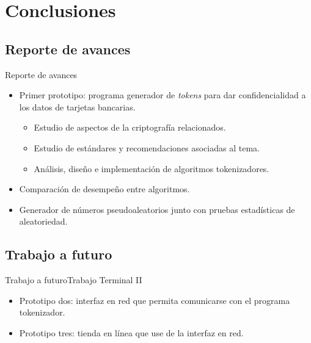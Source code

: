 %
%

\section{Conclusiones}

\subsection{Reporte de avances} %
\begin{frame}{Reporte de avances}

  \begin{itemize}
    \item<2-> Primer prototipo: programa generador de \textit{tokens} para
      dar confidencialidad a los datos de tarjetas bancarias.
      \begin{itemize}
        \item<3-> Estudio de aspectos de la criptografía relacionados.
        \item<4-> Estudio de estándares y recomendaciones asociadas al tema.
        \item<5-> Análisis, diseño e implementación de algoritmos tokenizadores.
      \end{itemize}
    \item<6-> Comparación de desempeño entre algoritmos.
    \item<7-> Generador de números pseudoaleatorios junto con pruebas
      estadísticas de aleatoriedad.
  \end{itemize}

\end{frame}

\subsection{Trabajo a futuro} %
\begin{frame}{Trabajo a futuro}{Trabajo Terminal II}

  \begin{itemize}
    \item<2-> Prototipo dos: interfaz en red que permita comunicarse con el
      programa tokenizador.
    \item<3-> Prototipo tres: tienda en línea que use de la interfaz en red.
  \end{itemize}

\end{frame}
